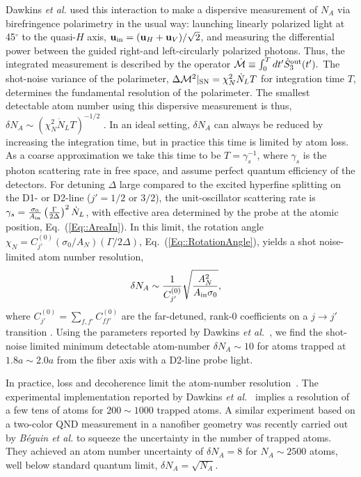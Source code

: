 \documentclass[preprint, aps,pra,onecolumn]{revtex4-1} %
\newcommand{\erf}[1]{Eq.~(\ref{#1})}
\newcommand{\mbf}[1]{\mathbf{#1}}
\newcommand{\inp}{{\rm in}}
\newcommand{\shotnoise}{\Delta \mathcal{M}^2 |_{\rm SN}}
\newcommand{\chiN}{\chi_{N}}
\newcommand{\Abir}{A_N}
\begin{document}
Dawkins {\em et al.} \cite{dawkins_dispersive_2011} used this interaction to make a dispersive measurement of $N_A$ via birefringence polarimetry in the usual way: launching linearly polarized light at 45$^\circ$ to the quasi-$H$ axis, $\mbf{u}_\inp = (\mbf{u}_H + \mbf{u}_V )/\sqrt{2}$, and measuring the differential power between the guided right-and left-circularly polarized photons. 
Thus, the integrated measurement is described by the operator $\hat{\mathcal{M}} \equiv \int_0^T dt' \hat{S}^{\rm out}_3(t').$  The shot-noise variance of the polarimeter, $\shotnoise =  \chiN^2 \dot{N}_L T$ for integration time $T$,  determines the fundamental resolution of the polarimeter.  
The smallest detectable atom number using this dispersive measurement is thus, $\delta N_A \sim ( \chiN^2 \dot{N}_L T)^{-1/2}$ \cite{smith_faraday_2003}.  
In an ideal setting, $\delta N_A$ can always be reduced by increasing the integration time, but in practice this time is limited by atom loss. As a coarse approximation we take this time to be $T=\gamma_s^{-1}$, where $\gamma_s$ is the photon scattering rate in free space, and assume perfect quantum efficiency of the detectors.  
For detuning $\Delta$ large compared to the excited hyperfine splitting on the D1- or D2-line ($j' = 1/2$ or $3/2$), the unit-oscillator scattering rate is 
$\gamma_s =\frac{\sigma_0}{A_{\rm in}}\left(\frac{\Gamma}{2 \Delta}\right)^2 \dot{N}_L $, 
with effective area determined by the probe at the atomic position, \erf{Eq::AreaIn}.  
In this limit, the rotation angle $\chiN = C^{(0)}_{j'} (\sigma_0/\Abir)(\Gamma/2\Delta)$, \erf{Eq::RotationAngle}, yields a shot noise-limited atom number resolution, 
	\begin{align} \label{Eq::AtomNumberResolution}
		\delta N_A  &\sim \frac{1}{C^{(0)}_{j'}}\sqrt {\frac{\Abir^2}{A_{\rm in} \sigma_0}},
	\end{align}
where $ C^{(0)}_{j'}=\sum_{f,f'}C^{(0)}_{ff'}$ are the far-detuned, rank-$0$ coefficients on a $j \rightarrow j'$ transition \cite{deutsch_quantum_2010}.  
Using the parameters reported by Dawkins \emph{et al.}~\cite{dawkins_dispersive_2011}, we find the shot-noise limited minimum detectable atom-number $\delta N_A \sim 10$ for atoms trapped at $ 1.8a\sim 2.0a $ from the fiber axis with a D2-line probe light. 

In practice, loss and decoherence limit the atom-number resolution~\cite{dawkins_dispersive_2011, zhang_collective_2012}. 
The experimental implementation reported by Dawkins \emph{et al.}~\cite{dawkins_dispersive_2011} implies a resolution of a few tens of atoms for $ 200\sim 1000 $ trapped atoms.  
A similar experiment based on a two-color QND measurement in a nanofiber geometry was recently carried out by \emph{B\'{e}guin et al.} \cite{beguin_generation_2014} to squeeze the uncertainty in the number of trapped atoms. They achieved an atom number uncertainty of $\delta N_A = 8$ for $N_A\sim2500$ atoms, well below standard quantum limit, $\delta N_A=\sqrt{N_A}$.
\end{document}

